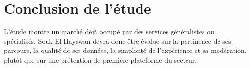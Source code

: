 \section{Conclusion de l’étude}
L’étude montre un marché déjà occupé par des services généralistes ou spécialisés. Souk El Hayawan devra donc être évalué sur la pertinence de ses parcours, la qualité de ses données, la simplicité de l’expérience et sa modération, plutôt que sur une prétention de première plateforme du secteur.
